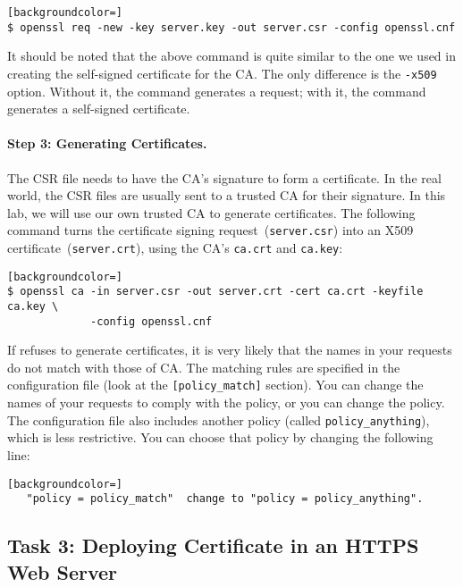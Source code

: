 \begin{lstlisting}[backgroundcolor=]
$ openssl req -new -key server.key -out server.csr -config openssl.cnf
\end{lstlisting}


It should be noted that the above command is quite similar to the one
we used in creating the self-signed certificate for the CA. The only
difference is the {\tt -x509} option. Without it, the command 
generates a request; with it, the command generates a self-signed 
certificate.


\paragraph{Step 3: Generating Certificates.}
The CSR file needs to have the CA's signature to form a certificate. In 
the real world, the CSR files are usually sent to a trusted CA for their 
signature. In this lab, we will use our own trusted CA 
to generate certificates. The following command turns the 
certificate signing request~({\tt server.csr}) into 
an X509 certificate~({\tt server.crt}), using the CA's
{\tt ca.crt} and {\tt ca.key}:

\begin{lstlisting}[backgroundcolor=]
$ openssl ca -in server.csr -out server.crt -cert ca.crt -keyfile ca.key \
             -config openssl.cnf
\end{lstlisting}


If \OpenSSL refuses to generate certificates, it is very likely that
the names in your requests do not match with those of CA. The matching
rules are specified in the configuration file (look at 
the \texttt{[policy\_match]} section). You can change the names of your 
requests to comply with the policy, or you can change the 
policy.  The configuration file 
also includes another policy (called \texttt{policy\_anything}), 
which is less restrictive. You can choose that policy by
changing the following line: 

\begin{lstlisting}[backgroundcolor=]
   "policy = policy_match"  change to "policy = policy_anything".
\end{lstlisting} 



\subsection{Task 3: Deploying Certificate in an HTTPS Web Server}

